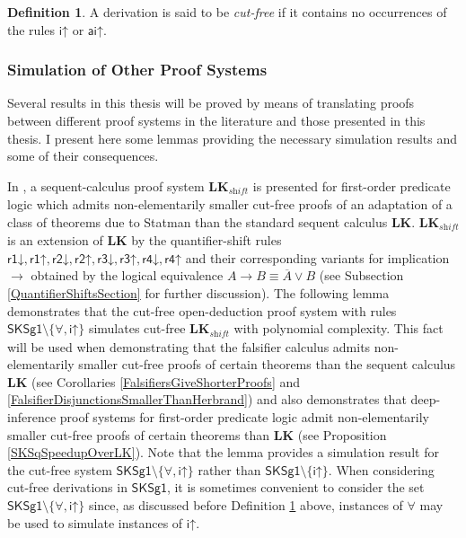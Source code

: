 \documentclass[10pt]{article}
\theoremstyle{definition}\newtheorem{remark}[theorem]{Remark}
\theoremstyle{definition}\newtheorem{example}[theorem]{Example}
\theoremstyle{definition}\newtheorem{definition}[theorem]{Definition}
\newcommand{\SKSq}{{\mathsf{SKSg1}}}
\newcommand{\aiUp}{{\mathsf{ai\mathord\uparrow}}}
\newcommand{\iUp}{{\mathsf{i\mathord\uparrow}}}
\newcommand{\rOneUp}{{\mathsf{r1\mathord\uparrow}}}
\newcommand{\rOneDown}{{\mathsf{r1\mathord\downarrow}}}
\newcommand{\rTwoUp}{{\mathsf{r2\mathord\uparrow}}}
\newcommand{\rTwoDown}{{\mathsf{r2\mathord\downarrow}}}
\newcommand{\rThreeUp}{{\mathsf{r3\mathord\uparrow}}}
\newcommand{\rThreeDown}{{\mathsf{r3\mathord\downarrow}}}
\newcommand{\rFourUp}{{\mathsf{r4\mathord\uparrow}}}
\newcommand{\rFourDown}{{\mathsf{r4\mathord\downarrow}}}
\begin{document}
	\begin{definition}\label{CutFreeDefinition}
		A derivation is said to be \textit{cut-free} if it contains no occurrences of the rules $\iUp$ or $\aiUp$.
	\end{definition}
	
	\subsubsection*{Simulation of Other Proof Systems}
	
	Several results in this thesis will be proved by means of translating proofs between different proof systems in the literature and those presented in this thesis. I present here some lemmas providing the necessary simulation results and some of their consequences.
	
	In \cite{BaazUnsoundInferences}, a sequent-calculus proof system $\textbf{LK}_{\textit{shift}}$ is presented for first-order predicate logic which admits non-elementarily smaller cut-free proofs of an adaptation of a class of theorems due to Statman \cite{StatmanLowerBounds} than the standard sequent calculus $\textbf{LK}$. $\textbf{LK}_{\textit{shift}}$ is an extension of $\textbf{LK}$ by the quantifier-shift rules $\rOneDown, \rOneUp, \rTwoDown, \rTwoUp, \rThreeDown, \rThreeUp, \rFourDown, \rFourUp$ and their corresponding variants for implication $\rightarrow$ obtained by the logical equivalence $A \rightarrow B \equiv \overline{A} \lor B$ (see Subsection \ref{QuantifierShiftsSection} for further discussion). The following lemma demonstrates that the cut-free open-deduction proof system with rules $\SKSq \setminus \{\forall, \iUp\}$ simulates cut-free $\textbf{LK}_{\textit{shift}}$ with polynomial complexity. This fact will be used when demonstrating that the falsifier calculus admits non-elementarily smaller cut-free proofs of certain theorems than the sequent calculus $\textbf{LK}$ (see Corollaries \ref{FalsifiersGiveShorterProofs} and \ref{FalsifierDisjunctionsSmallerThanHerbrand}) and also demonstrates that deep-inference proof systems for first-order predicate logic admit non-elementarily smaller cut-free proofs of certain theorems than $\textbf{LK}$ (see Proposition \ref{SKSqSpeedupOverLK}). Note that the lemma provides a simulation result for the cut-free system $\SKSq \setminus \{\forall, \iUp\}$ rather than $\SKSq \setminus \{\iUp\}$. When considering cut-free derivations in $\SKSq$, it is sometimes convenient to consider the set $\SKSq \setminus \{\forall, \iUp\}$ since, as discussed before Definition \ref{CutFreeDefinition} above, instances of $\forall$ may be used to simulate instances of $\iUp$.
	
\end{document}
